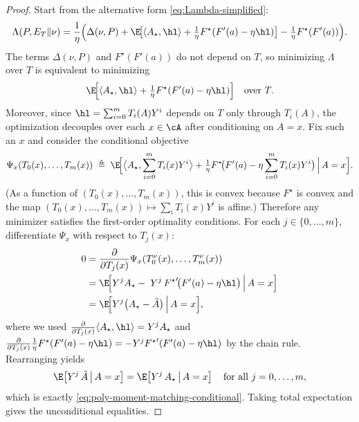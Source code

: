 \begin{proof}
    Start from the alternative form \eqref{eq:Lambda-simplified}:
    \[
        \Lambda(P,E_T\|\nu)
        =\frac{1}{\eta}\Big(\Delta(\nu,P)
        +\E\!\big[\langle A_\star,\hl\rangle + \tfrac{1}{\eta}F^\star(F'(a)-\eta\hl)\big]
        -\tfrac{1}{\eta}F^\star(F'(a))\Big).
    \]
    The terms $\Delta(\nu,P)$ and $F^\star(F'(a))$ do not depend on $T$, so minimizing $\Lambda$
    over $T$ is equivalent to minimizing
    \[
        \E\!\Big[\langle A_\star,\hl\rangle + \tfrac{1}{\eta}F^\star(F'(a)-\eta\hl)\Big]
        \quad\text{over }T.
    \]
    Moreover, since $\hl=\sum_{i=0}^m T_i(A)Y^i$ depends on $T$ only through $T_i(A)$,
    the optimization decouples over each $x\in\cA$ after conditioning on $A=x$.
    Fix such an $x$ and consider the conditional objective
    \[
        \Psi_x(T_0(x),\dots,T_m(x))
        \;\triangleq\;
        \E\!\Big[\big\langle A_\star,\sum_{i=0}^m T_i(x)Y^i\big\rangle
            +\tfrac{1}{\eta}F^\star\!\big(F'(a)-\eta\sum_{i=0}^m T_i(x)Y^i\big)\,\Big|\,A=x\Big].
    \]
    (As a function of $(T_0(x),\dots,T_m(x))$, this is convex because $F^\star$ is convex and the map
    $(T_0(x),\dots,T_m(x))\mapsto \sum_i T_i(x)Y^i$ is affine.)
    Therefore any minimizer satisfies the first-order optimality conditions.
    For each $j\in\{0,\dots,m\}$, differentiate $\Psi_x$ with respect to $T_j(x)$:
    \begin{align*}
        0
         & =\frac{\partial}{\partial T_j(x)}\Psi_x(T^\nu_0(x),\dots,T^\nu_m(x)) \\
         & =
        \E\!\Big[Y^j A_\star
        -\;Y^j\,{F^\star}'\!\big(F'(a)-\eta\hl\big)\,\Big|\,A=x\Big]            \\
         & =
        \E\!\Big[Y^j\big(A_\star-\tilde{A}\big)\,\Big|\,A=x\Big],
    \end{align*}
    where we used $\frac{\partial}{\partial T_j(x)}\langle A_\star,\hl\rangle = Y^j A_\star$ and
    $\frac{\partial}{\partial T_j(x)}\frac{1}{\eta}F^\star(F'(a)-\eta\hl)
        = -Y^j {F^\star}'(F'(a)-\eta\hl)$ by the chain rule.
    Rearranging yields
    \[
        \E\!\left[Y^j\,\tilde{A}\,\middle|\,A=x\right]
        =
        \E\!\left[Y^j\,A_\star\,\middle|\,A=x\right]
        \quad\text{for all }j=0,\dots,m,
    \]
    which is exactly \eqref{eq:poly-moment-matching-conditional}. Taking total expectation gives the
    unconditional equalities.
\end{proof}

